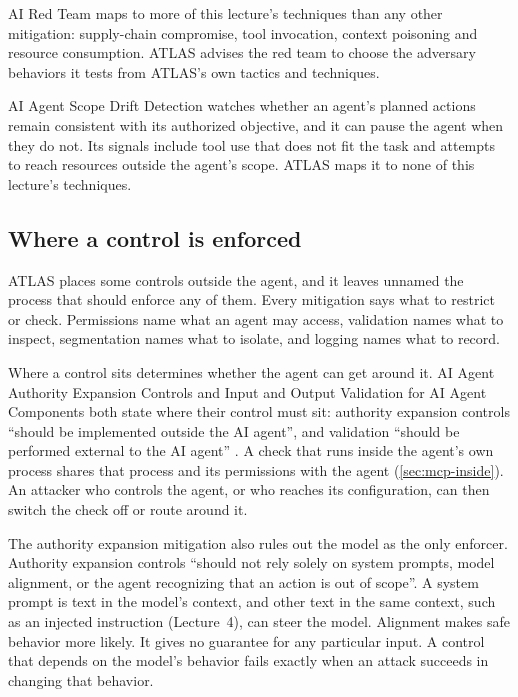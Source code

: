 AI Red Team maps to more of this lecture's techniques than any other mitigation: supply-chain
compromise, tool invocation, context poisoning and resource consumption. ATLAS advises the red team
to choose the adversary behaviors it tests from ATLAS's own tactics and techniques.

AI Agent Scope Drift Detection watches whether an agent's planned actions remain consistent with
its authorized objective, and it can pause the agent when they do not. Its signals include tool use
that does not fit the task and attempts to reach resources outside the agent's scope. ATLAS maps it
to none of this lecture's techniques.

\subsection{Where a control is enforced}
\label{sec:mitigations-enforcer}

ATLAS places some controls outside the agent, and it leaves unnamed the process that should
enforce any of them. Every mitigation says what to restrict or check. Permissions name what an
agent may access, validation names what to inspect, segmentation names what to isolate, and logging
names what to record.

Where a control sits determines whether the agent can get around it. AI Agent Authority Expansion
Controls and Input and Output Validation for AI Agent Components both state where their control must
sit: authority expansion controls ``should be implemented outside the AI agent'', and validation
``should be performed external to the AI agent'' \citep{mitre-atlas-2026}. A check that runs inside
the agent's own process shares that process and its permissions with the agent (\cref{sec:mcp-inside}). An
attacker who controls the agent, or who reaches its configuration, can then switch the check off or
route around it.

The authority expansion mitigation also rules out the model as the only enforcer. Authority
expansion controls ``should not rely solely on system prompts, model alignment, or the agent
recognizing that an action is out of scope''. A system prompt is text in the model's context, and
other text in the same context, such as an injected instruction (Lecture~4), can steer the model.
Alignment makes safe behavior more likely. It gives no guarantee for any particular input. A control
that depends on the model's behavior fails exactly when an attack succeeds in changing that
behavior.

